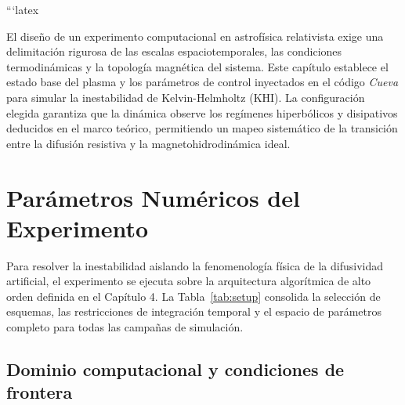 ```latex

\primerparrafo El diseño de un experimento computacional en astrofísica relativista exige una delimitación rigurosa de las escalas espaciotemporales, las condiciones termodinámicas y la topología magnética del sistema. Este capítulo establece el estado base del plasma y los parámetros de control inyectados en el código \textit{Cueva} para simular la inestabilidad de Kelvin-Helmholtz (KHI). La configuración elegida garantiza que la dinámica observe los regímenes hiperbólicos y disipativos deducidos en el marco teórico, permitiendo un mapeo sistemático de la transición entre la difusión resistiva y la magnetohidrodinámica ideal.

\section{Parámetros Numéricos del Experimento}

\primerparrafo Para resolver la inestabilidad aislando la fenomenología física de la difusividad artificial, el experimento se ejecuta sobre la arquitectura algorítmica de alto orden definida en el Capítulo 4. La Tabla~\ref{tab:setup} consolida la selección de esquemas, las restricciones de integración temporal y el espacio de parámetros completo para todas las campañas de simulación. 

\subsection{Dominio computacional y condiciones de frontera}

